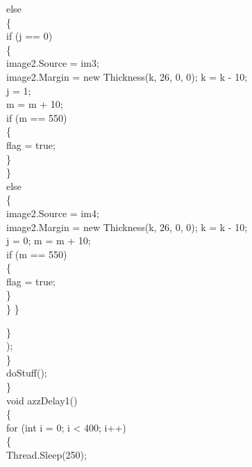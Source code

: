 {{                    else\\
                    \{\\
                        if (j == 0)\\
                        \{\\
                            image2.Source = im3;\\
                            image2.Margin = new Thickness(k, 26, 0, 0); k = k - 10;\\
                            j = 1; \\
                            
                                m = m + 10;\\
                                if (m == 550)\\
                                \{\\
                                    flag = true;\\
                                \}\\
                        \}\\
                        else\\
                        \{\\
                            image2.Source = im4;\\
                            image2.Margin = new Thickness(k, 26, 0, 0); k = k - 10;\\
                            j = 0; m = m + 10;\\
                            if (m == 550)\\
                            \{\\
                                flag = true;\\
                            \}\\
                        \}
                    \}
                   



                \}\\);\\
            \}\\
           doStuff();\\
        \}\\
        
        void azzDelay1()\\
        \{\\

            for (int i = 0; i < 400; i++)\\
            \{\\
                Thread.Sleep(250);\\
                

}}
